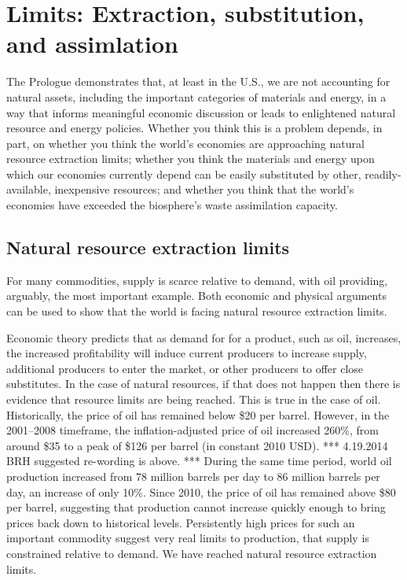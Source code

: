 \section{Limits: Extraction, substitution, and assimlation}
\label{sec:limits}

The Prologue demonstrates that, at least in the U.S., 
we are not accounting for natural assets, 
including the important categories of materials and energy,
in a way that informs meaningful economic discussion or
leads to enlightened natural resource and energy policies.
Whether you think this is a problem depends, in part, on 
whether you think the world's economies are approaching 
	natural resource extraction limits;
whether you think the materials and energy upon which our economies currently depend
	can be easily substituted by other, readily-available, inexpensive resources; and
whether you think that the world's economies have exceeded 
	the biosphere's waste assimilation capacity.


\subsection{Natural resource extraction limits}
\label{sub:natural_resource_extraction_limits}

For many commodities, supply is scarce relative to demand, 
with oil providing, arguably, the most important example. 
Both economic and physical arguments can be used to show that the world is facing
natural resource extraction limits.

Economic theory predicts that as demand for for a product, such as oil, increases,
the increased profitability will induce current producers to increase supply, 
additional producers to enter the market,
or other producers to offer close substitutes. 
In the case of natural resources, if that does not happen
then there is evidence that resource limits are being reached.
This is true in the case of oil.
Historically, the price of oil has remained below \$20 per barrel.
However, in the 2001--2008 timeframe,
the inflation-adjusted price of oil increased 260\%,
from around \$35 to a peak of \$126 per barrel 
(in constant 2010 USD).
*** 4.19.2014 BRH suggested re-wording is above. ***
During the same time period,
world oil production increased from 
78 million barrels per day to 86 million barrels per day,
an increase of only 10\%.\cite{EIA2014}
Since 2010, the price of oil has remained above \$80 per barrel,
suggesting that production cannot increase quickly enough to bring prices
back down to historical levels.
Persistently high prices for such an important commodity
suggest very real limits to production, 
that supply is constrained relative to demand. 
We have reached natural resource extraction limits.

